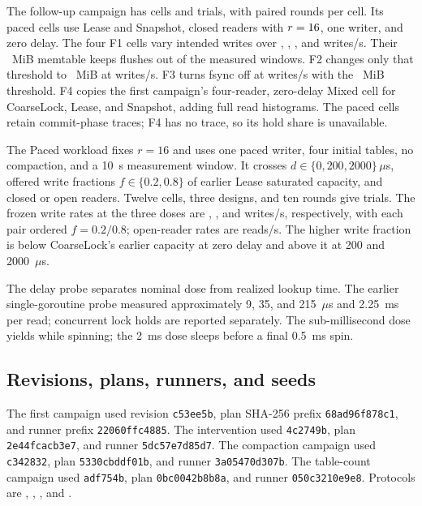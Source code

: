 The follow-up campaign has \FollowCells{} cells and \FollowTrials{} trials, with \FollowRounds{} paired rounds per cell. Its \FollowPacedCells{} paced cells use Lease and Snapshot, closed readers with $r=16$, one writer, and zero delay. The four F1 cells vary intended writes over \FollowRateLow{}, \FollowRateSecond{}, \FollowRateThird{}, and \FollowRateHigh{} writes/s. Their \FollowMemLarge{}~MiB memtable keeps flushes out of the measured windows. F2 changes only that threshold to \FollowMemSmall{}~MiB at \FollowRateHigh{} writes/s. F3 turns fsync off at \FollowRateHigh{} writes/s with the \FollowMemLarge{}~MiB threshold. F4 copies the first campaign's four-reader, zero-delay Mixed cell for CoarseLock, Lease, and Snapshot, adding full read histograms. The paced cells retain commit-phase traces; F4 has no trace, so its hold share is unavailable.

The Paced workload fixes $r=16$ and uses one paced writer, four initial tables, no compaction, and a 10~s measurement window. It crosses $d\in\{0,200,2000\}\,\mu$s, offered write fractions $f\in\{0.2,0.8\}$ of earlier Lease saturated capacity, and closed or open readers. Twelve cells, three designs, and ten rounds give \PacedTrialCount{} trials. The frozen write rates at the three doses are \PacedRatesZero{}, \PacedRatesMedium{}, and \PacedRatesHigh{} writes/s, respectively, with each pair ordered $f=0.2/0.8$; open-reader rates are \PacedOpenRates{} reads/s. The higher write fraction is below CoarseLock's earlier capacity at zero delay and above it at 200 and 2000~$\mu$s. 

The delay probe separates nominal dose from realized lookup time. The earlier single-goroutine probe measured approximately 9, 35, and 215~$\mu$s and 2.25~ms per read; concurrent lock holds are reported separately. The sub-millisecond dose yields while spinning; the 2~ms dose sleeps before a final 0.5~ms spin.

\subsection{Revisions, plans, runners, and seeds}
The first campaign used revision \texttt{c53ee5b}, plan SHA-256 prefix \texttt{68ad96f878c1}, and runner prefix \texttt{22060ffc4885}. The intervention used \texttt{4c2749b}, plan \texttt{2e44fcacb3e7}, and runner \texttt{5dc57e7d85d7}. The compaction campaign used \texttt{c342832}, plan \texttt{5330cbddf01b}, and runner \texttt{3a05470d307b}. The table-count campaign used \texttt{adf754b}, plan \texttt{0bc0042b8b8a}, and runner \texttt{050c3210e9e8}. Protocols are , , , and .

